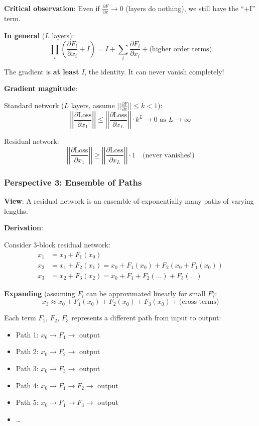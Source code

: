 \documentclass[11pt,oneside]{book}
\begin{document}
\textbf{Critical observation}: Even if $\frac{\partial F}{\partial x} \to 0$ (layers do nothing), we still have the ``+I'' term.

\textbf{In general} ($L$ layers):
\[
\prod_i \left(\frac{\partial F_i}{\partial x_i} + I\right) = I + \sum_i \frac{\partial F_i}{\partial x_i} + \text{(higher order terms)}
\]

The gradient is \textbf{at least} $I$, the identity. It can never vanish completely!

\textbf{Gradient magnitude}:

Standard network ($L$ layers, assume $||\frac{\partial F}{\partial x}|| \leq k < 1$):
\[
\left|\left|\frac{\partial \text{Loss}}{\partial x_1}\right|\right| \leq \left|\left|\frac{\partial \text{Loss}}{\partial x_L}\right|\right| \cdot k^L \to 0 \text{ as } L \to \infty
\]

Residual network:
\[
\left|\left|\frac{\partial \text{Loss}}{\partial x_1}\right|\right| \geq \left|\left|\frac{\partial \text{Loss}}{\partial x_L}\right|\right| \cdot 1 \quad \text{(never vanishes!)}
\]

\subsubsection{Perspective 3: Ensemble of Paths}

\textbf{View}: A residual network is an ensemble of exponentially many paths of varying lengths.

\textbf{Derivation}:

Consider 3-block residual network:
\begin{align*}
x_1 &= x_0 + F_1(x_0) \\
x_2 &= x_1 + F_2(x_1) = x_0 + F_1(x_0) + F_2(x_0 + F_1(x_0)) \\
x_3 &= x_2 + F_3(x_2) = x_0 + F_1 + F_2(\ldots) + F_3(\ldots)
\end{align*}

\textbf{Expanding} (assuming $F_i$ can be approximated linearly for small $F$):
\[
x_3 \approx x_0 + F_1(x_0) + F_2(x_0) + F_3(x_0) + \text{(cross terms)}
\]

Each term $F_1$, $F_2$, $F_3$ represents a different path from input to output:
\begin{itemize}
\item Path 1: $x_0 \to F_1 \to$ output
\item Path 2: $x_0 \to F_2 \to$ output
\item Path 3: $x_0 \to F_3 \to$ output
\item Path 4: $x_0 \to F_1 \to F_2 \to$ output
\item Path 5: $x_0 \to F_1 \to F_3 \to$ output
\item \ldots
\end{itemize}
\end{document}

